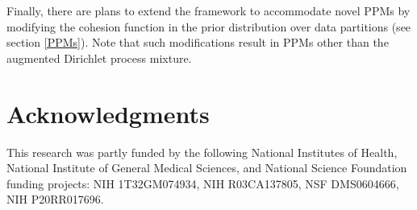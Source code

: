 \documentclass[article, nojss]{jss}
\begin{document}
Finally, there are plans to extend the  framework to accommodate novel PPMs by modifying the cohesion function in the prior distribution over data partitions (see section \ref{PPMs}). Note that such modifications result in PPMs other than the augmented Dirichlet process mixture. 

\section*{Acknowledgments}
This research was partly funded by the following National Institutes of Health, National Institute of General Medical Sciences, and National Science Foundation funding projects: NIH 1T32GM074934, NIH R03CA137805, NSF DMS0604666, NIH P20RR017696.


\end{document}
